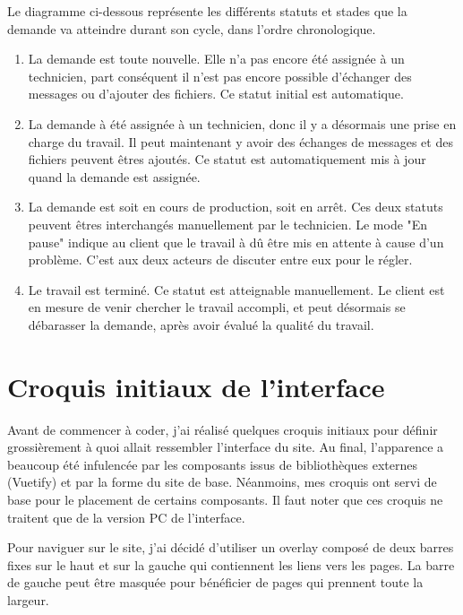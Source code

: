 \documentclass[
    iai, %
    eai, %
]{heig-tb}
\begin{document}
Le diagramme ci-dessous représente les différents statuts et stades que la demande va atteindre durant son cycle, dans l'ordre chronologique.


\begin{enumerate}
  \item La demande est toute nouvelle. Elle n'a pas encore été assignée à un technicien, part conséquent il n'est pas encore possible d'échanger des messages ou d'ajouter des fichiers. Ce statut initial est automatique.
  \item La demande à été assignée à un technicien, donc il y a désormais une prise en charge du travail. Il peut maintenant y avoir des échanges de messages et des fichiers peuvent êtres ajoutés. Ce statut est automatiquement mis à jour quand la demande est assignée.
  \item La demande est soit en cours de production, soit en arrêt. Ces deux statuts peuvent êtres interchangés manuellement par le technicien. Le mode "En pause" indique au client que le travail à dû être mis en attente à cause d'un problème. C'est aux deux acteurs de discuter entre eux pour le régler.
  \item Le travail est terminé. Ce statut est atteignable manuellement. Le client est en mesure de venir chercher le travail accompli, et peut désormais se débarasser la demande, après avoir évalué la qualité du travail.
\end{enumerate}
\bigskip

\newpage
\section{Croquis initiaux de l'interface}
Avant de commencer à coder, j'ai réalisé quelques croquis initiaux pour définir grossièrement à quoi allait ressembler l'interface du site.
Au final, l'apparence a beaucoup été infulencée par les composants issus de bibliothèques externes (Vuetify) et par la forme du site de base.
Néanmoins, mes croquis ont servi de base pour le placement de certains composants. Il faut noter que ces croquis ne traitent que de la version PC de l'interface.

Pour naviguer sur le site, j'ai décidé d'utiliser un overlay composé de deux barres fixes sur le haut et sur la gauche qui contiennent les liens vers les pages.
La barre de gauche peut être masquée pour bénéficier de pages qui prennent toute la largeur.
\end{document}
